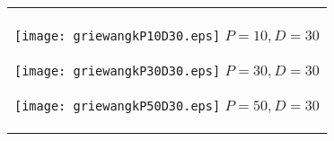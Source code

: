 \documentclass[a4paper,11pt,oneside,openany]{jsbook}
\begin{document}
\begin{figure}[htbp]
  \begin{center}
    \begin{tabular}{c}


      \begin{minipage}{0.33\hsize}
        \begin{center}
          \texttt{[image: griewangkP10D30.eps]}
          \hspace{1.2cm}$P=10, D=30
$        \end{center}
      \end{minipage}

      \begin{minipage}{0.33\hsize}
        \begin{center}
          \texttt{[image: griewangkP30D30.eps]}
          \hspace{1.2cm}$P=30, D=30
$        \end{center}
      \end{minipage}

      \begin{minipage}{0.33\hsize}
        \begin{center}
          \texttt{[image: griewangkP50D30.eps]}
          \hspace{1.2cm}$P=50, D=30
$        \end{center}
      \end{minipage}
    \end{tabular}
  \end{center}
\end{figure}
\end{document}

